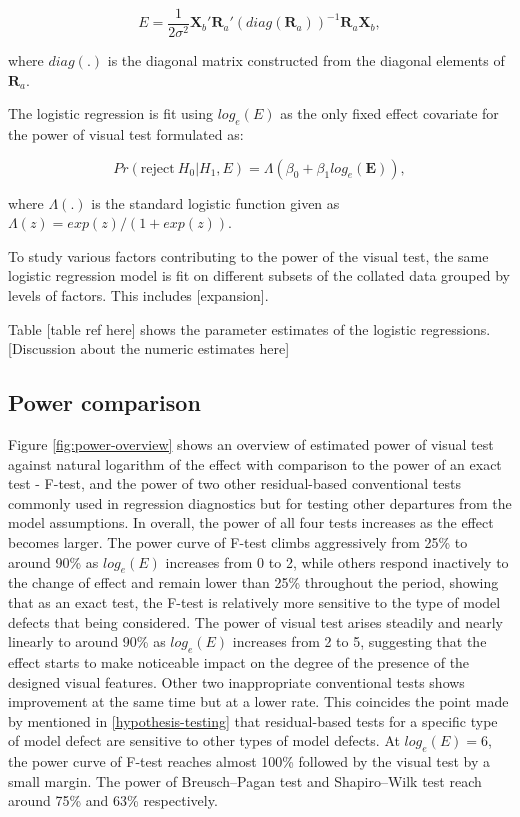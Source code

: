 \documentclass[]{interact}
\theoremstyle{plain}%
\theoremstyle{definition}
\theoremstyle{remark}
\begin{document}
\begin{equation} \label{eq:effect-size-ex1}
E = \frac{1}{2\sigma^2}\boldsymbol{X}_b'\boldsymbol{R}_a'(diag(\boldsymbol{R}_a))^{-1}\boldsymbol{R}_a\boldsymbol{X}_b,
\end{equation}

where \(diag(.)\) is the diagonal matrix constructed from the diagonal
elements of \(\boldsymbol{R}_a\).

The logistic regression is fit using \(log_e(E)\) as the only fixed
effect covariate for the power of visual test formulated as:

\begin{equation} \label{eq:logistic-regression-1-1}
Pr(\text{reject}~H_0|H_1,E) = \Lambda(\beta_0 + \beta_1 log_e(\boldsymbol{E})),
\end{equation}

where \(\Lambda(.)\) is the standard logistic function given as
\(\Lambda(z) = exp(z)/(1+exp(z))\).

To study various factors contributing to the power of the visual test,
the same logistic regression model is fit on different subsets of the
collated data grouped by levels of factors. This includes
{[}expansion{]}.

Table {[}table ref here{]} shows the parameter estimates of the logistic
regressions. {[}Discussion about the numeric estimates here{]}

\hypertarget{power-comparison}{%
\subsection{Power comparison}\label{power-comparison}}

Figure \ref{fig:power-overview} shows an overview of estimated power of
visual test against natural logarithm of the effect with comparison to
the power of an exact test - F-test, and the power of two other
residual-based conventional tests commonly used in regression
diagnostics but for testing other departures from the model assumptions.
In overall, the power of all four tests increases as the effect becomes
larger. The power curve of F-test climbs aggressively from 25\% to
around 90\% as \(log_e(E)\) increases from 0 to 2, while others respond
inactively to the change of effect and remain lower than 25\% throughout
the period, showing that as an exact test, the F-test is relatively more
sensitive to the type of model defects that being considered. The power
of visual test arises steadily and nearly linearly to around 90\% as
\(log_e(E)\) increases from 2 to 5, suggesting that the effect starts to
make noticeable impact on the degree of the presence of the designed
visual features. Other two inappropriate conventional tests shows
improvement at the same time but at a lower rate. This coincides the
point made by \citet{cook1982residuals} mentioned in
\ref{hypothesis-testing} that residual-based tests for a specific type
of model defect are sensitive to other types of model defects. At
\(log_e(E) = 6\), the power curve of F-test reaches almost 100\%
followed by the visual test by a small margin. The power of
Breusch--Pagan test and Shapiro--Wilk test reach around 75\% and 63\%
respectively.
\end{document}
